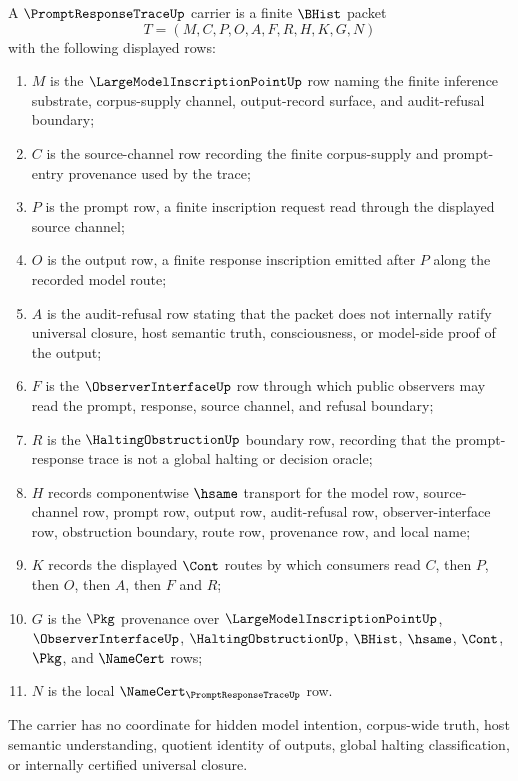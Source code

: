 \begin{definition}
\label{def:prompt-response-trace-carrier}
A $\PromptResponseTraceUp$ carrier is a finite $\BHist$ packet
$$
T=(M,C,P,O,A,F,R,H,K,G,N)
$$
with the following displayed rows:
\begin{enumerate}
\item $M$ is the $\LargeModelInscriptionPointUp$ row naming the finite inference substrate, corpus-supply channel, output-record surface, and audit-refusal boundary;
\item $C$ is the source-channel row recording the finite corpus-supply and prompt-entry provenance used by the trace;
\item $P$ is the prompt row, a finite inscription request read through the displayed source channel;
\item $O$ is the output row, a finite response inscription emitted after $P$ along the recorded model route;
\item $A$ is the audit-refusal row stating that the packet does not internally ratify universal closure, host semantic truth, consciousness, or model-side proof of the output;
\item $F$ is the $\ObserverInterfaceUp$ row through which public observers may read the prompt, response, source channel, and refusal boundary;
\item $R$ is the $\HaltingObstructionUp$ boundary row, recording that the prompt-response trace is not a global halting or decision oracle;
\item $H$ records componentwise $\hsame$ transport for the model row, source-channel row, prompt row, output row, audit-refusal row, observer-interface row, obstruction boundary, route row, provenance row, and local name;
\item $K$ records the displayed $\Cont$ routes by which consumers read $C$, then $P$, then $O$, then $A$, then $F$ and $R$;
\item $G$ is the $\Pkg$ provenance over $\LargeModelInscriptionPointUp$, $\ObserverInterfaceUp$, $\HaltingObstructionUp$, $\BHist$, $\hsame$, $\Cont$, $\Pkg$, and $\NameCert$ rows;
\item $N$ is the local $\NameCert_{\PromptResponseTraceUp}$ row.
\end{enumerate}
The carrier has no coordinate for hidden model intention, corpus-wide truth, host semantic understanding, quotient identity of outputs, global halting classification, or internally certified universal closure.
\end{definition}

